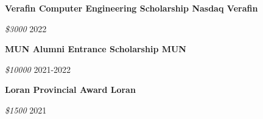 \textbf{Verafin Computer Engineering Scholarship \hfill Nasdaq Verafin} \par
\textit{\$3000} \hfill 2022 \par
\textbf{MUN Alumni Entrance Scholarship \hfill MUN} \par
\textit{\$10000} \hfill 2021-2022 \par
\textbf{Loran Provincial Award \hfill Loran} \par
\textit{\$1500} \hfill 2021 \par
